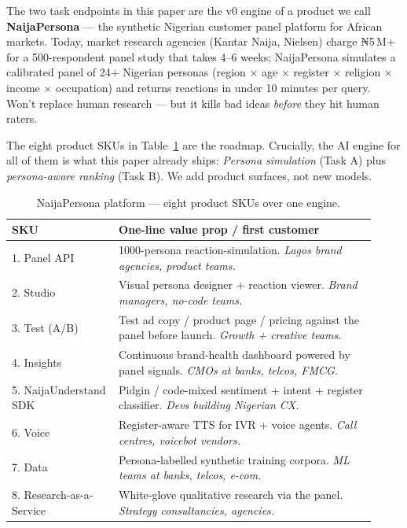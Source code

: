 \documentclass[sigconf,nonacm,balance]{acmart}
\begin{document}
The two task endpoints in this paper are the v0 engine of a product we
call \textbf{NaijaPersona} --- the synthetic Nigerian customer panel
platform for African markets. Today, market research agencies (Kantar
Naija, Nielsen) charge ₦5\,M+ for a 500-respondent panel study that
takes 4--6 weeks; NaijaPersona simulates a calibrated panel of 24+
Nigerian personas (region $\times$ age $\times$ register $\times$
religion $\times$ income $\times$ occupation) and returns reactions in
under 10 minutes per query. Won't replace human research --- but it
kills bad ideas \emph{before} they hit human raters.

The eight product SKUs in Table~\ref{tab:naijapersona-skus} are the
roadmap. Crucially, the AI engine for all of them is what this paper
already ships: \emph{Persona simulation} (Task A) plus
\emph{persona-aware ranking} (Task B). We add product surfaces, not new
models.

\begin{table}[t]
\caption{NaijaPersona platform --- eight product SKUs over one engine.}
\label{tab:naijapersona-skus}
\small
\begin{tabular}{p{0.27\linewidth}p{0.65\linewidth}}
\toprule
\textbf{SKU} & \textbf{One-line value prop / first customer} \\
\midrule
1. Panel API & 1000-persona reaction-simulation. \emph{Lagos brand agencies, product teams.} \\
2. Studio & Visual persona designer + reaction viewer. \emph{Brand managers, no-code teams.} \\
3. Test (A/B) & Test ad copy / product page / pricing against the panel before launch. \emph{Growth + creative teams.} \\
4. Insights & Continuous brand-health dashboard powered by panel signals. \emph{CMOs at banks, telcos, FMCG.} \\
5. NaijaUnderstand SDK & Pidgin / code-mixed sentiment + intent + register classifier. \emph{Devs building Nigerian CX.} \\
6. Voice & Register-aware TTS for IVR + voice agents. \emph{Call centres, voicebot vendors.} \\
7. Data & Persona-labelled synthetic training corpora. \emph{ML teams at banks, telcos, e-com.} \\
8. Research-as-a-Service & White-glove qualitative research via the panel. \emph{Strategy consultancies, agencies.} \\
\bottomrule
\end{tabular}
\end{table}
\end{document}
